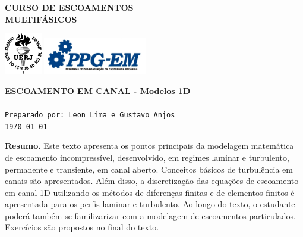 
\thispagestyle{empty}

\begin{minipage}{0.5\linewidth}
	\large\textbf{CURSO DE ESCOAMENTOS\\MULTIFÁSICOS}
\end{minipage}
\begin{minipage}{0.5\linewidth}
	\flushright
	\includegraphics[height=18mm]{figs/logo_uerj_PB.png}
	\hspace{.5cm}
	\includegraphics[height=16mm]{figs/logo_ppg-em.jpg}
\end{minipage}

\hrulefill

\Large \color{NavyBlue} \textbf{ESCOAMENTO EM CANAL - Modelos 1D}\\
\color{Black}\\ %
\normalsize \texttt{Preparado por: Leon Lima e Gustavo Anjos}\\
\normalsize \texttt{\today}


\hrulefill
\begin{center}
	\begin{minipage}{0.8\linewidth}
		\footnotesize{\textbf{Resumo.} Este texto apresenta os pontos
		principais da modelagem matemática de escoamento incompressível,
		desenvolvido, em regimes laminar e turbulento, permanente e
		transiente, em canal aberto. Conceitos básicos de turbulência
		em canais são apresentados. Além disso, a discretização das
		equações de escoamento em canal 1D utilizando os métodos de
		diferenças finitas e de elementos finitos é apresentada para os
		perfis laminar e turbulento. Ao longo do texto, o estudante
		poderá também se familizarizar com a modelagem de escoamentos
		particulados. Exercícios são propostos no final do texto.}
	\end{minipage}
\end{center}

{\footnotesize\tableofcontents}
\hrulefill\\
\onehalfspacing
\vspace{10mm}

